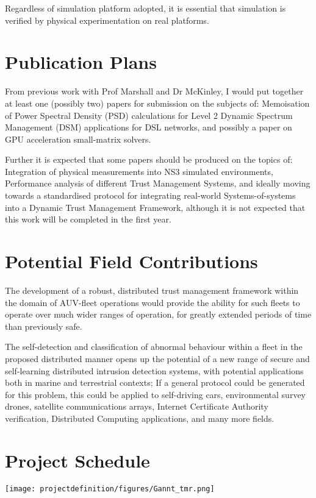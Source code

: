\documentclass[twoside,10pt,a4paper]{Latex/Classes/PhDthesisPSnPDF}
\begin{document}
Regardless of simulation platform adopted, it is essential that simulation is 
verified by physical experimentation on real platforms.

\section{Publication Plans}
From previous work with Prof Marshall and Dr McKinley, I would put together at
least one (possibly two) papers for submission on the subjects of: Memoisation
of Power Spectral Density (PSD) calculations for Level 2 Dynamic Spectrum Management
(DSM) applications for DSL networks, and possibly a paper on GPU acceleration
small-matrix solvers. 

Further it is expected that some papers should be produced on the topics of:
Integration of physical measurements into NS3 simulated environments,
Performance analysis of different Trust Management Systems, and ideally moving
towards a standardised protocol for integrating real-world Systems-of-systems
into a Dynamic Trust Management Framework, although it is not expected that 
this work will be completed in the first year.

\section{Potential Field Contributions}
The development of a robust, distributed trust management framework within the 
domain of AUV-fleet operations would provide the ability for such fleets to 
operate over much wider ranges of operation, for greatly extended periods of 
time than previously safe. 

The self-detection and classification of abnormal behaviour within a fleet in
the proposed distributed manner opens up the potential of a new range of secure
and self-learning distributed intrusion detection systems, with potential
applications both in marine and terrestrial contexts; If a general protocol 
could be generated for this problem, this could be applied to self-driving 
cars, environmental survey drones, satellite communications arrays,
Internet Certificate Authority verification, Distributed Computing 
applications, and many more fields.

\section{Project Schedule}
\texttt{[image: projectdefinition/figures/Gannt\_tmr.png]}
\end{document}
